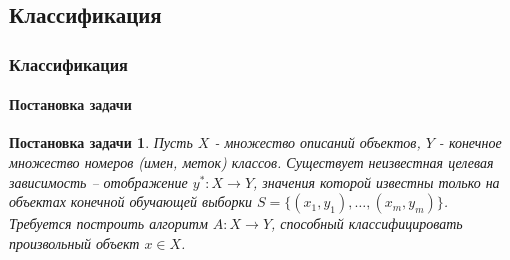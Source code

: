 \documentclass[xcolor=table]{beamer}
\newtheorem{prob}{Постановка задачи}
\begin{document}



\subsection{Классификация}
\begin{frame}
  \frametitle{Классификация}
  \framesubtitle{Постановка задачи}
  
  \begin{prob}
    Пусть $X$ - множество описаний объектов, $Y$ - конечное множество номеров (имен, меток) классов.
    Существует неизвестная \emph{целевая зависимость} -- отображение $y^*: X \rightarrow Y$, значения которой
    известны только на объектах конечной обучающей выборки $S = \{(x_1, y_1), \dots, (x_m, y_m)\}$.
    Требуется построить алгоритм $A: X \rightarrow Y$, способный классифицировать произвольный объект $x \in X$.
  \end{prob}

  \vspace{-15pt}


\end{frame}
\end{document}
